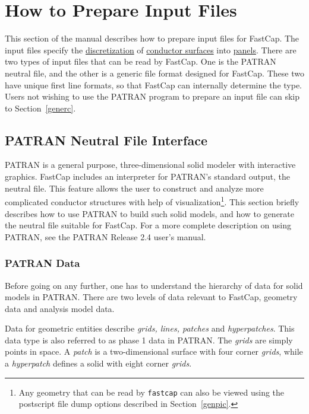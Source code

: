 %
%
%
\section{How to Prepare Input Files}
\label{all}

This section of the manual describes how to prepare input files for
FastCap.  The input files specify the \underline{discretization} of
\underline{conductor surfaces} into \underline{panels}.  There are
two types of input files that can be read by FastCap.  One is the
PATRAN neutral file, and the other is a generic file format designed
for FastCap.  These two have unique first line formats, so that
FastCap can internally determine the type.  Users not wishing to
use the PATRAN program to prepare an input file can skip to 
Section~\ref{generc}.
   
\subsection{PATRAN Neutral File Interface}
\label{neuif}

PATRAN is a general purpose, three-dimensional solid modeler with
interactive graphics.  FastCap includes an interpreter for PATRAN's
standard output, the neutral file.  This feature allows the user to
construct and analyze more complicated conductor structures with help
of visualization\footnote{Any geometry that can be read by
{\tt fastcap} can also be viewed using the postscript file dump options
described in Section~\ref{genpic}.}.  
This section briefly describes how to use PATRAN to
build such solid models, and how to generate the neutral file suitable
for FastCap.  For a more complete description on using PATRAN, see the
PATRAN Release 2.4 user's manual.


\subsubsection{PATRAN Data}

Before going on any further, one has to understand the hierarchy of
data for solid models in PATRAN.  There are two levels of data
relevant to FastCap, geometry data and analysis model data.

Data for geometric entities describe {\em grids, lines, patches} and
{\em hyperpatches}.  This data type is also referred to as phase 1
data in PATRAN.  The {\em grids} are simply points in space.  A {\em
patch} is a two-dimensional surface with four corner {\em grids},
while a {\em hyperpatch} defines a solid with eight corner {\em
grids}.

